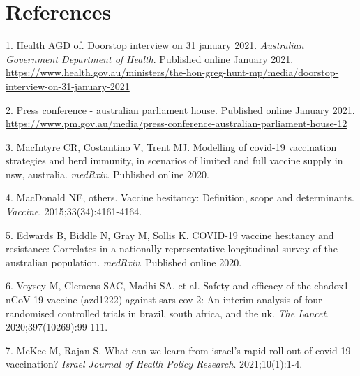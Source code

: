 \documentclass{article}
\begin{document}
\newpage

\hypertarget{references}{%
\section*{References}\label{references}}

\hypertarget{refs}{}
\leavevmode\hypertarget{ref-gh2021a}{}%
1. Health AGD of. Doorstop interview on 31 january 2021.
\emph{Australian Government Department of Health}. Published online
January 2021.
\url{https://www.health.gov.au/ministers/the-hon-greg-hunt-mp/media/doorstop-interview-on-31-january-2021}

\leavevmode\hypertarget{ref-pm2021}{}%
2. Press conference - australian parliament house. Published online
January 2021.
\url{https://www.pm.gov.au/media/press-conference-australian-parliament-house-12}

\leavevmode\hypertarget{ref-macintyre2020modelling}{}%
3. MacIntyre CR, Costantino V, Trent MJ. Modelling of covid-19
vaccination strategies and herd immunity, in scenarios of limited and
full vaccine supply in nsw, australia. \emph{medRxiv}. Published online
2020.

\leavevmode\hypertarget{ref-macdonald2015vaccine}{}%
4. MacDonald NE, others. Vaccine hesitancy: Definition, scope and
determinants. \emph{Vaccine}. 2015;33(34):4161-4164.

\leavevmode\hypertarget{ref-edwards2020covid}{}%
5. Edwards B, Biddle N, Gray M, Sollis K. COVID-19 vaccine hesitancy and
resistance: Correlates in a nationally representative longitudinal
survey of the australian population. \emph{medRxiv}. Published online
2020.

\leavevmode\hypertarget{ref-voysey2020safety}{}%
6. Voysey M, Clemens SAC, Madhi SA, et al. Safety and efficacy of the
chadox1 nCoV-19 vaccine (azd1222) against sars-cov-2: An interim
analysis of four randomised controlled trials in brazil, south africa,
and the uk. \emph{The Lancet}. 2020;397(10269):99-111.

\leavevmode\hypertarget{ref-mckee2021can}{}%
7. McKee M, Rajan S. What can we learn from israel's rapid roll out of
covid 19 vaccination? \emph{Israel Journal of Health Policy Research}.
2021;10(1):1-4.



\end{document}
